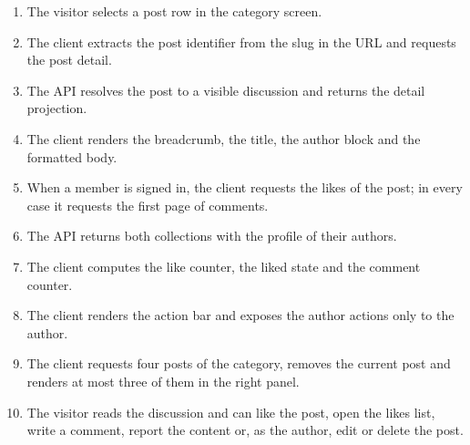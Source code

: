 \begin{enumerate}[leftmargin=1.8em,topsep=3pt,itemsep=2pt,parsep=0pt]
      \item The visitor selects a post row in the category screen.
      \item The client extracts the post identifier from the slug in the URL and requests
            the post detail.
      \item The API resolves the post to a visible discussion and returns the detail
            projection.
      \item The client renders the breadcrumb, the title, the author block and the
            formatted body.
      \item When a member is signed in, the client requests the likes of the post; in every
            case it requests the first page of comments.
      \item The API returns both collections with the profile of their authors.
      \item The client computes the like counter, the liked state and the comment counter.
      \item The client renders the action bar and exposes the author actions only to the
            author.
      \item The client requests four posts of the category, removes the current post and
            renders at most three of them in the right panel.
      \item The visitor reads the discussion and can like the post, open the likes list,
            write a comment, report the content or, as the author, edit or delete the post.
\end{enumerate}

